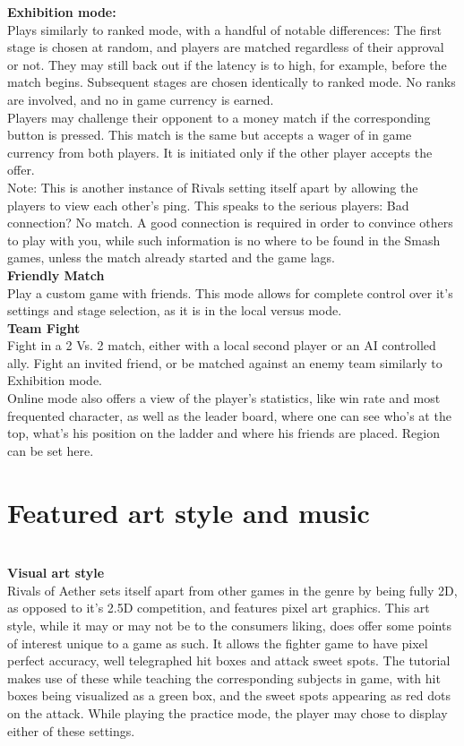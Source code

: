\documentclass{article}
\begin{document}
\textbf{Exhibition mode:}\\
Plays similarly to ranked mode, with a handful of notable differences: The first stage is chosen at random, and players are matched regardless of their approval or not. They may still back out if the latency is to high, for example, before the match begins. Subsequent stages are chosen identically to ranked mode. No ranks are involved, and no in game currency is earned.\\
Players may challenge their opponent to a money match if the corresponding button is pressed. This match is the same but accepts a wager of in game currency from both players. It is initiated only if the other player accepts the offer.\\

Note: This is another instance of Rivals setting itself apart by allowing the players to view each other's ping. This speaks to the serious players: Bad connection? No match. A good connection is required in order to convince others to play with you, while such information is no where to be found in the Smash games, unless the match already started and the game lags.\\

\textbf{Friendly Match}\\
Play a custom game with friends. This mode allows for complete control over it's settings and stage selection, as it is in the local versus mode.
\\
\textbf{Team Fight}\\
Fight in a 2 Vs. 2 match, either with a local second player or an AI controlled ally. Fight an invited friend, or be matched against an enemy team similarly to Exhibition mode.
\\

Online mode also offers a view of the player's statistics, like win rate and most frequented character, as well as the leader board, where one can see who's at the top, what's his position on the ladder and where his friends are placed. Region can be set here.\\


\chapter{\textbf{Featured art style and music}}\\

\textbf{Visual art style}\\
Rivals of Aether sets itself apart from other games in the genre by being fully 2D, as opposed to it's 2.5D competition, and features pixel art graphics. This art style, while it may or may not be to the consumers liking, does offer some points of interest unique to a game as such. It allows the fighter game to have pixel perfect accuracy, well telegraphed hit boxes and attack sweet spots. The tutorial makes use of these while teaching the corresponding subjects in game, with hit boxes being visualized as a green box, and the sweet spots appearing as red dots on the attack.
While playing the practice mode, the player may chose to display either of these settings.\\
\end{document}
